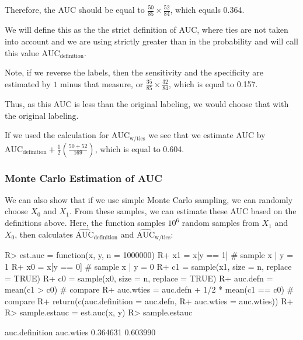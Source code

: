 \documentclass[article]{jss}
\begin{document}
Therefore, the AUC should be equal to
\(\frac{50}{85} \times \frac{52}{84}\), which equals 0.364.

We will define this as the the strict definition of AUC, where ties are
not taken into account and we are using strictly greater than in the
probability and will call this value \(\text{AUC}_{\text{definition}}\).

Note, if we reverse the labels, then the sensitivity and the specificity
are estimated by \(1\) minus that measure, or
\(\frac{35}{85} \times \frac{32}{84}\), which is equal to 0.157.

Thus, as this AUC is less than the original labeling, we would choose
that with the original labeling.

If we used the calculation for \(\text{AUC}_{\text{w/ties}}\) we see
that we estimate AUC by
\(\text{AUC}_{\text{definition}} + \frac{1}{2}\left( \frac{50 + 52}{169}\right)\),
which is equal to 0.604.

\hypertarget{monte-carlo-estimation-of-auc}{%
\subsubsection{Monte Carlo Estimation of
AUC}\label{monte-carlo-estimation-of-auc}}

We can also show that if we use simple Monte Carlo sampling, we can
randomly choose \(X_{0}\) and \(X_{1}\). From these samples, we can
estimate these AUC based on the definitions above. Here, the function
 samples \(10^{6}\) random samples from \(X_{1}\) and
\(X_{0}\), then calculates \(\widehat{\text{AUC}}_{\text{definition}}\)
and \(\widehat{\text{AUC}}_{\text{w/ties}}\):

\begin{CodeChunk}

\begin{CodeInput}
R> est.auc = function(x, y, n = 1000000) {
R+   x1 = x[y == 1] # sample x | y = 1
R+   x0 = x[y == 0] # sample x | y = 0
R+   c1 = sample(x1, size = n, replace = TRUE)
R+   c0 = sample(x0, size = n, replace = TRUE)
R+   auc.defn = mean(c1 > c0) # compare
R+   auc.wties = auc.defn + 1/2 * mean(c1 == c0) # compare
R+   return(c(auc.definition = auc.defn,
R+            auc.wties = auc.wties))
R+ }
R> sample.estauc = est.auc(x, y)
R> sample.estauc
\end{CodeInput}

\begin{CodeOutput}
auc.definition      auc.wties 
      0.364631       0.603990 
\end{CodeOutput}
\end{CodeChunk}
\end{document}

